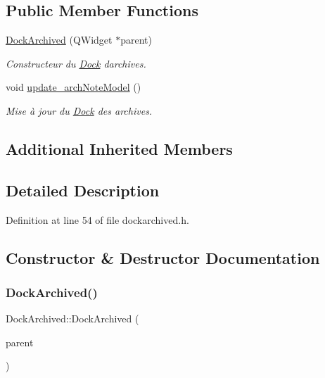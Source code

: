 \subsection*{Public Member Functions}
\begin{DoxyCompactItemize}
\item 
\hyperlink{class_dock_archived_ad3cc1b3cbaa84fed8d37c478927c7463}{Dock\+Archived} (Q\+Widget $\ast$parent)
\begin{DoxyCompactList}\small\item\em Constructeur du \hyperlink{class_dock}{Dock} d\textquotesingle{}archives. \end{DoxyCompactList}\item 
\mbox{\label{class_dock_archived_a557ea9fc3b685f0aefbae0bcd624cbec}} 
void \hyperlink{class_dock_archived_a557ea9fc3b685f0aefbae0bcd624cbec}{update\+\_\+arch\+Note\+Model} ()
\begin{DoxyCompactList}\small\item\em Mise à jour du \hyperlink{class_dock}{Dock} des archives. \end{DoxyCompactList}\end{DoxyCompactItemize}
\subsection*{Additional Inherited Members}


\subsection{Detailed Description}


Definition at line 54 of file dockarchived.\+h.



\subsection{Constructor \& Destructor Documentation}
\mbox{\label{class_dock_archived_ad3cc1b3cbaa84fed8d37c478927c7463}} 
\subsubsection{\texorpdfstring{Dock\+Archived()}{DockArchived()}}
{\footnotesize\ttfamily Dock\+Archived\+::\+Dock\+Archived (\begin{DoxyParamCaption}\item[{Q\+Widget $\ast$}]{parent }\end{DoxyParamCaption})\hspace{0.3cm}{\ttfamily [inline]}}



